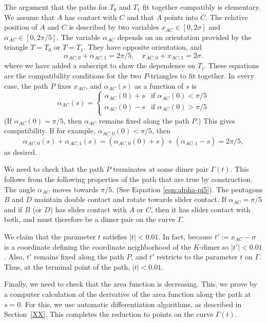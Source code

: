 The argument that the paths for $T_0$ and $T_1$ fit together compatibly is elementary.
We assume that $A$ has contact with $C$ and that $A$ points into $C$.
The relative position of $A$ and $C$ is described by two variables $x_{AC}\in[0,2\sigma]$ and 
$\alpha_{AC}\in[0,2\pi/5]$.
The variable $\alpha_{AC}$ depends on an orientation provided by the triangle $T=T_0$ or $T=T_1$.
They have opposite orientation, and 
\begin{equation}\label{eqn:alpha-sum}
\alpha_{AC,0}+\alpha_{AC,1} = 2\pi/5,\quad x_{AC,0} + x_{AC,1} = 2\sigma.
\end{equation}
where we have added a subscript to show the dependence on $T_i$.  These equations are the
compatibility conditions for the two $P$-triangles to fit together.
In every case, the path $P$ fixes $x_{AC}$, and  $\alpha_{AC}(s)$ as a function of $s$ is
\begin{equation}\label{eqn:alpha-pi5}
\alpha_{AC}(s) = 
\begin{cases}
\alpha_{AC}(0) + s&\text{if } \alpha_{AC}(0) < \pi/5\\
\alpha_{AC}(0) - s&\text{if } \alpha_{AC}(0) > \pi/5\\
\end{cases}
\end{equation}
(If $\alpha_{AC}(0) = \pi/5$, then $\alpha_{AC}$ remains fixed along the path $P$.)
This gives compatibility. If for example, $\alpha_{AC,0}(0) < \pi/5$, then
\[
\alpha_{AC,0}(s) + \alpha_{AC,1}(s) = (\alpha_{AC,0}(0) + s) + (\alpha_{AC,1} - s) = 2\pi/5,
\]
as desired.

We need to check that the path $P$ terminates at some dimer pair $\Gamma(t)$.  This follows from
the following properties of the path that are true by construction.  The angle $\alpha_{AC}$ moves
towards $\pi/5$. (See Equation \ref{eqn:alpha-pi5}). The pentagons $B$ and $D$ maintain double contact
and rotate towards slider contact.   If $\alpha_{AC}=\pi/5$ and if $B$ (or $D$) has slider contact with $A$ or $C$,
then it has slider contact with both, and must therefore be a dimer pair on the curve $\Gamma$.

We claim that the parameter $t$ satisfies $|t|<0.01$.  In fact, 
because $t' := x_{AC}-\sigma$ is a coordinate defining the
coordinate neighborhood of the $K$-dimer so $|t'|<0.01$.  Also, $t'$ remains fixed along the path $P$,
and $t'$ restricts to the parameter $t$ on $\Gamma$.  Thus, at the terminal point of the path, $|t|<0.01$.

Finally, we need to check that the area function is decreasing. This, we prove by a computer calculation
of the derivative of the area function along the path at $s=0$.  For this, we use automatic differentiation algorithms,
as described in Section~\ref{XX}.  This completes the reduction to points on the curve $\Gamma(t)$.


